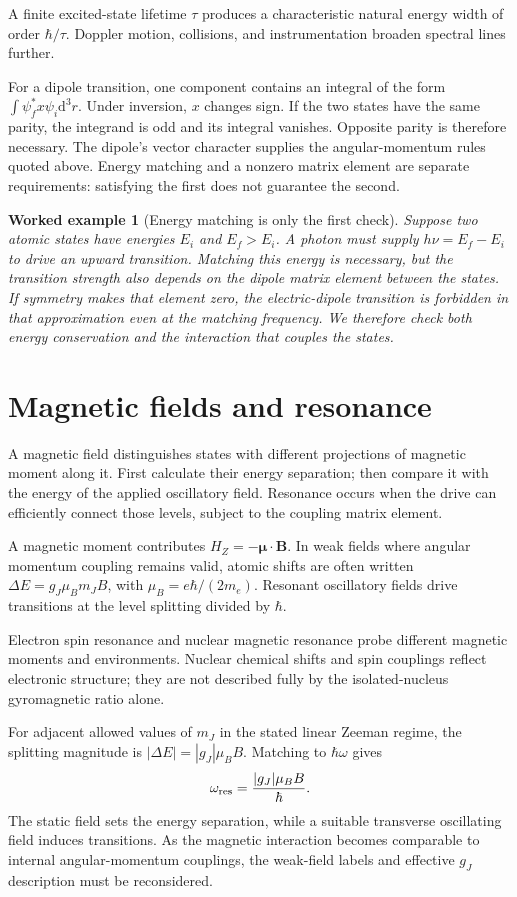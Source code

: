 \documentclass[11pt,oneside]{book}
\newcommand{\dd}{\mathrm{d}}
\newcommand{\vect}[1]{\boldsymbol{#1}}
\theoremstyle{reviewstyle}
\newtheorem{example}{Worked example}[chapter]
\begin{document}
A finite excited-state lifetime $\tau$ produces a characteristic natural energy width of order $\hbar/\tau$. Doppler motion, collisions, and instrumentation broaden spectral lines further.

For a dipole transition, one component contains an integral of the form $\int\psi_f^*x\psi_i\dd^3r$. Under inversion, $x$ changes sign. If the two states have the same parity, the integrand is odd and its integral vanishes. Opposite parity is therefore necessary. The dipole's vector character supplies the angular-momentum rules quoted above. Energy matching and a nonzero matrix element are separate requirements: satisfying the first does not guarantee the second.

\begin{example}[Energy matching is only the first check]
Suppose two atomic states have energies $E_i$ and $E_f>E_i$. A photon must supply $h\nu=E_f-E_i$ to drive an upward transition. Matching this energy is necessary, but the transition strength also depends on the dipole matrix element between the states. If symmetry makes that element zero, the electric-dipole transition is forbidden in that approximation even at the matching frequency. We therefore check both energy conservation and the interaction that couples the states.
\end{example}

\section{Magnetic fields and resonance}
A magnetic field distinguishes states with different projections of magnetic moment along it. First calculate their energy separation; then compare it with the energy of the applied oscillatory field. Resonance occurs when the drive can efficiently connect those levels, subject to the coupling matrix element.

A magnetic moment contributes $H_Z=-\vect\mu\cdot\vect B$. In weak fields where angular momentum coupling remains valid, atomic shifts are often written $\Delta E=g_J\mu_Bm_JB$, with $\mu_B=e\hbar/(2m_e)$. Resonant oscillatory fields drive transitions at the level splitting divided by $\hbar$.

Electron spin resonance and nuclear magnetic resonance probe different magnetic moments and environments. Nuclear chemical shifts and spin couplings reflect electronic structure; they are not described fully by the isolated-nucleus gyromagnetic ratio alone.

For adjacent allowed values of $m_J$ in the stated linear Zeeman regime, the splitting magnitude is $|\Delta E|=|g_J|\mu_BB$. Matching to $\hbar\omega$ gives
\begin{equation}
\omega_{\rm res}=\frac{|g_J|\mu_BB}{\hbar}.
\end{equation}
The static field sets the energy separation, while a suitable transverse oscillating field induces transitions. As the magnetic interaction becomes comparable to internal angular-momentum couplings, the weak-field labels and effective $g_J$ description must be reconsidered.
\end{document}
